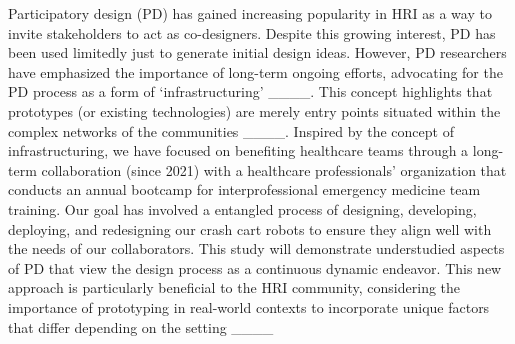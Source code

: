 Participatory design (PD) has gained increasing popularity in HRI as a way to invite stakeholders to act as co-designers. %
 Despite this growing interest, PD has been used limitedly just to generate initial design ideas. 
However, PD researchers have emphasized the importance of long-term ongoing efforts, advocating for the PD process as a form of `infrastructuring' ____. 
This concept highlights that prototypes (or existing technologies) are merely entry points situated within the complex networks of the communities ____. %
Inspired by the concept of infrastructuring, we have focused on benefiting healthcare teams through a long-term collaboration (since 2021) with a healthcare professionals’ organization that conducts an annual bootcamp for interprofessional emergency medicine team training. 
Our goal has involved a entangled process of designing, developing, deploying, and redesigning our crash cart robots to ensure they align well with the needs of our collaborators. This study will demonstrate understudied aspects of PD that view the design process as a continuous dynamic endeavor. 
This new approach is particularly beneficial to the HRI community, considering the importance of prototyping in real-world contexts to incorporate unique factors that differ depending on the setting ____ %



%
